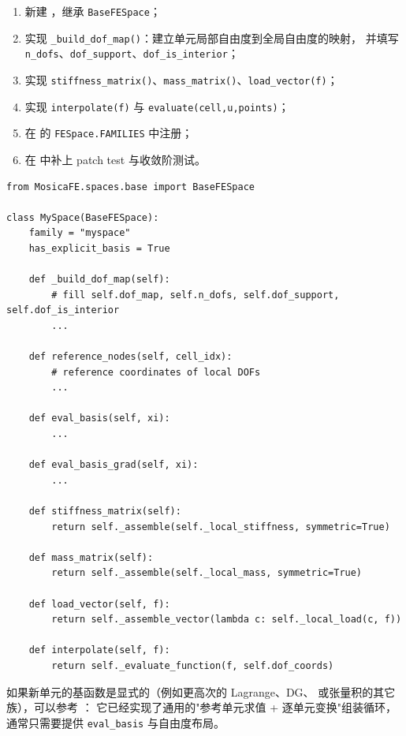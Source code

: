 \documentclass[UTF8,11pt,oneside]{ctexbook}
\theoremstyle{definition}
\theoremstyle{plain}
\newenvironment{important}{%
  \begin{tcolorbox}[colback=blue!5,colframe=blue!45,title=要点,fonttitle=\bfseries]%
}{%
  \end{tcolorbox}%
}
\newcommand{\code}[1]{\texttt{#1}}
\begin{document}
\begin{enumerate}[label=(\arabic*),itemsep=0.2em]
  \item 新建 ，继承 \code{BaseFESpace}；
  \item 实现 \code{\_\allowbreak build\_\allowbreak dof\_\allowbreak map()}：建立单元局部自由度到全局自由度的映射，
        并填写 \code{n\_\allowbreak dofs}、\code{dof\_\allowbreak support}、\code{dof\_\allowbreak is\_\allowbreak interior}；
  \item 实现 \code{stiffness\_\allowbreak matrix()}、\code{mass\_\allowbreak matrix()}、\code{load\_\allowbreak vector(f)}；
  \item 实现 \code{interpolate(f)} 与 \code{evaluate(cell,\allowbreak  u,\allowbreak  points)}；
  \item 在  的 \code{FESpace.FAMILIES} 中注册；
  \item 在  中补上 patch test 与收敛阶测试。
\end{enumerate}

\begin{lstlisting}[language=MosicaFE,caption={示例 12.1：显式基函数空间的骨架},label={lst:newspace}]
from MosicaFE.spaces.base import BaseFESpace

class MySpace(BaseFESpace):
    family = "myspace"
    has_explicit_basis = True

    def _build_dof_map(self):
        # fill self.dof_map, self.n_dofs, self.dof_support, self.dof_is_interior
        ...

    def reference_nodes(self, cell_idx):
        # reference coordinates of local DOFs
        ...

    def eval_basis(self, xi):
        ...

    def eval_basis_grad(self, xi):
        ...

    def stiffness_matrix(self):
        return self._assemble(self._local_stiffness, symmetric=True)

    def mass_matrix(self):
        return self._assemble(self._local_mass, symmetric=True)

    def load_vector(self, f):
        return self._assemble_vector(lambda c: self._local_load(c, f))

    def interpolate(self, f):
        return self._evaluate_function(f, self.dof_coords)
\end{lstlisting}

\begin{important}
如果新单元的基函数是显式的（例如更高次的 Lagrange、DG、
或张量积的其它族），可以参考 ：
它已经实现了通用的"参考单元求值 + 逐单元变换"组装循环，
通常只需要提供 \code{eval\_\allowbreak basis} 与自由度布局。
\end{important}
\end{document}
